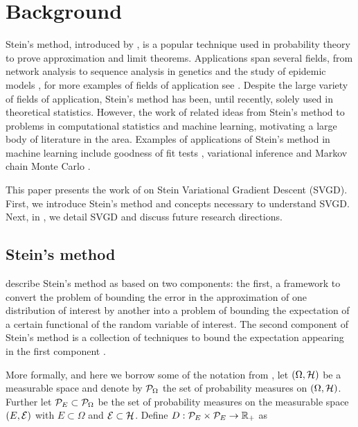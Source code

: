 

\section{Background}

Stein's method, introduced by \citet{stein1972bound}, is a popular technique used in probability theory to prove approximation and limit theorems. Applications span several fields, from network analysis \citep{Franceschetti:2006:CNL:1148663.1148705} to sequence analysis in genetics \citep{reinert2000probabilistic} and the study of epidemic models \citep{ball1990poisson}, for more examples of fields of application see \cite{reinert2011short}. Despite the large variety of fields of application, Stein's method has been, until recently, solely used in theoretical statistics. However, the work of \citep{oates2017control,oates2019convergence,gorham2015measuring, liu2016kernelized} related ideas from Stein's method to problems in computational statistics and machine learning, motivating a large body of literature in the area. Examples of  applications of Stein's method in machine learning include goodness of fit tests \cite{liu2016kernelized,chwialkowski2016kernel,yang2019stein, kanagawa2019kernel}, variational inference \cite{liu2016stein,zhuo2017message, wang2017stein, han2018stein} and Markov chain Monte Carlo \cite{shaloudegi2018adaptive,chen2019stein}. 

This paper presents the work of \citet{liu2016stein} on Stein Variational Gradient Descent (SVGD). First, we introduce Stein's method and concepts necessary to understand SVGD. Next, in , we detail SVGD and discuss future research directions.

\subsection{Stein's method}
\citet{ross2011fundamentals} describe Stein's method as based on two components: the first, a framework to convert the problem of bounding the error in the approximation of one distribution of interest by another into a problem of bounding the expectation of a certain functional of the random variable of interest. The second component of Stein’s method is a collection of techniques to bound the expectation appearing in the first component \cite{ross2011fundamentals}.

More formally, and here we borrow some of the notation from \cite{barp2019minimum}, let $(\Omega, \mathcal{H})$ be a measurable space and denote by $\mathcal{P}_{\Omega}$  the set of probability measures on $(\Omega, \mathcal{H})$. Further let $\mathcal{P}_{E} \subset \mathcal{P}_{\Omega}$ be the set of probability measures on the measurable space $(E, \mathcal{E})$ with $E \subset \Omega$ and $\mathcal{E} \subset \mathcal{H}$. Define $D: \mathcal{P}_{E} \times \mathcal{P}_{E} \rightarrow \mathbb{R}_+$ as

